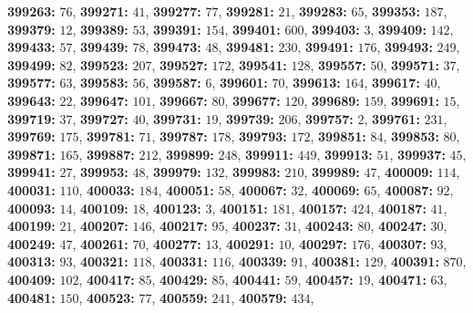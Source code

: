 \textsf{\bfseries 399263:} $76$, \textsf{\bfseries 399271:} $41$, \textsf{\bfseries 399277:} $77$, \textsf{\bfseries 399281:} $21$, \textsf{\bfseries 399283:} $65$, \textsf{\bfseries 399353:} $187$, \textsf{\bfseries 399379:} $12$, \textsf{\bfseries 399389:} $53$, \textsf{\bfseries 399391:} $154$, \textsf{\bfseries 399401:} $600$, \textsf{\bfseries 399403:} $3$, \textsf{\bfseries 399409:} $142$, \textsf{\bfseries 399433:} $57$, \textsf{\bfseries 399439:} $78$, \textsf{\bfseries 399473:} $48$, \textsf{\bfseries 399481:} $230$, \textsf{\bfseries 399491:} $176$, \textsf{\bfseries 399493:} $249$, \textsf{\bfseries 399499:} $82$, \textsf{\bfseries 399523:} $207$, \textsf{\bfseries 399527:} $172$, \textsf{\bfseries 399541:} $128$, \textsf{\bfseries 399557:} $50$, \textsf{\bfseries 399571:} $37$, \textsf{\bfseries 399577:} $63$, \textsf{\bfseries 399583:} $56$, \textsf{\bfseries 399587:} $6$, \textsf{\bfseries 399601:} $70$, \textsf{\bfseries 399613:} $164$, \textsf{\bfseries 399617:} $40$, \textsf{\bfseries 399643:} $22$, \textsf{\bfseries 399647:} $101$, \textsf{\bfseries 399667:} $80$, \textsf{\bfseries 399677:} $120$, \textsf{\bfseries 399689:} $159$, \textsf{\bfseries 399691:} $15$, \textsf{\bfseries 399719:} $37$, \textsf{\bfseries 399727:} $40$, \textsf{\bfseries 399731:} $19$, \textsf{\bfseries 399739:} $206$, \textsf{\bfseries 399757:} $2$, \textsf{\bfseries 399761:} $231$, \textsf{\bfseries 399769:} $175$, \textsf{\bfseries 399781:} $71$, \textsf{\bfseries 399787:} $178$, \textsf{\bfseries 399793:} $172$, \textsf{\bfseries 399851:} $84$, \textsf{\bfseries 399853:} $80$, \textsf{\bfseries 399871:} $165$, \textsf{\bfseries 399887:} $212$, \textsf{\bfseries 399899:} $248$, \textsf{\bfseries 399911:} $449$, \textsf{\bfseries 399913:} $51$, \textsf{\bfseries 399937:} $45$, \textsf{\bfseries 399941:} $27$, \textsf{\bfseries 399953:} $48$, \textsf{\bfseries 399979:} $132$, \textsf{\bfseries 399983:} $210$, \textsf{\bfseries 399989:} $47$, \textsf{\bfseries 400009:} $114$, \textsf{\bfseries 400031:} $110$, \textsf{\bfseries 400033:} $184$, \textsf{\bfseries 400051:} $58$, \textsf{\bfseries 400067:} $32$, \textsf{\bfseries 400069:} $65$, \textsf{\bfseries 400087:} $92$, \textsf{\bfseries 400093:} $14$, \textsf{\bfseries 400109:} $18$, \textsf{\bfseries 400123:} $3$, \textsf{\bfseries 400151:} $181$, \textsf{\bfseries 400157:} $424$, \textsf{\bfseries 400187:} $41$, \textsf{\bfseries 400199:} $21$, \textsf{\bfseries 400207:} $146$, \textsf{\bfseries 400217:} $95$, \textsf{\bfseries 400237:} $31$, \textsf{\bfseries 400243:} $80$, \textsf{\bfseries 400247:} $30$, \textsf{\bfseries 400249:} $47$, \textsf{\bfseries 400261:} $70$, \textsf{\bfseries 400277:} $13$, \textsf{\bfseries 400291:} $10$, \textsf{\bfseries 400297:} $176$, \textsf{\bfseries 400307:} $93$, \textsf{\bfseries 400313:} $93$, \textsf{\bfseries 400321:} $118$, \textsf{\bfseries 400331:} $116$, \textsf{\bfseries 400339:} $91$, \textsf{\bfseries 400381:} $129$, \textsf{\bfseries 400391:} $870$, \textsf{\bfseries 400409:} $102$, \textsf{\bfseries 400417:} $85$, \textsf{\bfseries 400429:} $85$, \textsf{\bfseries 400441:} $59$, \textsf{\bfseries 400457:} $19$, \textsf{\bfseries 400471:} $63$, \textsf{\bfseries 400481:} $150$, \textsf{\bfseries 400523:} $77$, \textsf{\bfseries 400559:} $241$, \textsf{\bfseries 400579:} $434$, 
